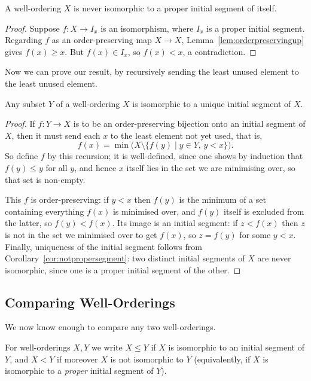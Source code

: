 \begin{corollary}\label{cor:notpropersegment}
  A well-ordering $X$ is never isomorphic to a proper initial segment of itself.
\end{corollary}
\begin{proof}
  Suppose $f : X \to I_x$ is an isomorphism, where $I_x$ is a proper initial segment. Regarding $f$ as an order-preserving map $X \to X$, Lemma~\ref{lem:orderpreservingup} gives $f(x) \geq x$. But $f(x) \in I_x$, so $f(x) < x$, a contradiction.
\end{proof}

Now we can prove our result, by recursively sending the least unused element to the least unused element.

\begin{proposition}\label{prop:subsetcollapse}
  Any subset $Y$ of a well-ordering $X$ is isomorphic to a unique initial segment of $X$.
\end{proposition}
\begin{proof}
  If $f: Y \to X$ is to be an order-preserving bijection onto an initial segment of $X$, then it must send each $x$ to the least element not yet used, that is,
  $$f(x) = \min\bigl(X \setminus \{f(y) \mid y \in Y, \, y < x\}\bigr).$$
  So define $f$ by this recursion; it is well-defined, since one shows by induction that $f(y) \leq y$ for all $y$, and hence $x$ itself lies in the set we are minimising over, so that set is non-empty.

  This $f$ is order-preserving: if $y < x$ then $f(y)$ is the minimum of a set containing everything $f(x)$ is minimised over, and $f(y)$ itself is excluded from the latter, so $f(y) < f(x)$. Its image is an initial segment: if $z < f(x)$ then $z$ is not in the set we minimised over to get $f(x)$, so $z = f(y)$ for some $y < x$. Finally, uniqueness of the initial segment follows from Corollary~\ref{cor:notpropersegment}: two distinct initial segments of $X$ are never isomorphic, since one is a proper initial segment of the other.
\end{proof}

\subsection{Comparing Well-Orderings}

We now know enough to compare any two well-orderings.

\begin{definition}
  For well-orderings $X, Y$ we write $X \leq Y$ if $X$ is isomorphic to an initial segment of $Y$, and $X < Y$ if moreover $X$ is not isomorphic to $Y$ (equivalently, if $X$ is isomorphic to a \emph{proper} initial segment of $Y$).
\end{definition}


